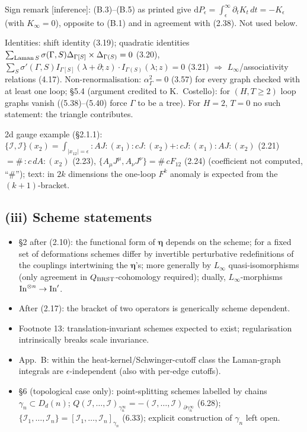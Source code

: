 \documentclass[10pt]{article}
\begin{document}
Sign remark [inference]: (B.3)--(B.5) as printed give $\mathrm dP_\epsilon=\int_\epsilon^\infty\partial_tK_t\,dt=-K_\epsilon$ (with $K_\infty=0$), opposite to (B.1) and in agreement with (2.38). Not used below.

Identities: shift identity (3.19); quadratic identities $\sum_{{\rm Laman}\,S}\sigma(\Gamma,S)\Delta_{\Gamma[S]}\times\Delta_{\Gamma(S)}=0$ (3.20), $\sum_S\sigma'(\Gamma,S)I_{\Gamma[S]}(\lambda+\partial;z)\cdot I_{\Gamma(S)}(\lambda;z)=0$ (3.21) $\Rightarrow$ $L_\infty$/associativity relations (4.17). Non-renormalisation: $\alpha_\Gamma^2=0$ (3.57) for every graph checked with at least one loop; \S5.4 (argument credited to K.~Costello): for $(H,T\ge2)$ loop graphs vanish ((5.38)--(5.40) force $\Gamma$ to be a tree). For $H=2$, $T=0$ no such statement: the triangle contributes.

2d gauge example (\S2.1.1): $\{\mathcal I,\mathcal I\}(x_2)=\int_{|x_{12}|=\epsilon}{:}AJ{:}(x_1){:}cJ{:}(x_2)+{:}cJ{:}(x_1){:}AJ{:}(x_2)$ (2.21) $=\#\,{:}c\,dA{:}(x_2)$ (2.23), $\{A_\mu J^\mu,A_\nu J^\nu\}=\#\,cF_{12}$ (2.24) (coefficient not computed, ``$\#$''); text: in $2k$ dimensions the one-loop $F^k$ anomaly is expected from the $(k+1)$-bracket.

\subsection{(iii) Scheme statements}
\begin{itemize}
\item \S2 after (2.10): the functional form of $\boldsymbol\eta$ depends on the scheme; for a fixed set of deformations schemes differ by invertible perturbative redefinitions of the couplings intertwining the $\boldsymbol\eta$'s; more generally by $L_\infty$ quasi-isomorphisms (only agreement in $Q_{\rm BRST}$-cohomology required); dually, $L_\infty$-morphisms ${\rm In}^{\otimes n}\to{\rm In}'$.
\item After (2.17): the bracket of two operators is generically scheme dependent.
\item Footnote 13: translation-invariant schemes expected to exist; regularisation intrinsically breaks scale invariance.
\item App.~B: within the heat-kernel/Schwinger-cutoff class the Laman-graph integrals are $\epsilon$-independent (also with per-edge cutoffs).
\item \S6 (topological case only): point-splitting schemes labelled by chains $\gamma_n\subset D_d(n)$; $Q(\mathcal I,\dots,\mathcal I)_{\gamma^\infty_n}=-(\mathcal I,\dots,\mathcal I)_{\partial\gamma^\infty_n}$ (6.28); $\{\mathcal I_1,\dots,\mathcal I_n\}=[\mathcal I_1,\dots,\mathcal I_n]_{\gamma_n}$ (6.33); explicit construction of $\gamma_n$ left open.
\end{itemize}
\end{document}
